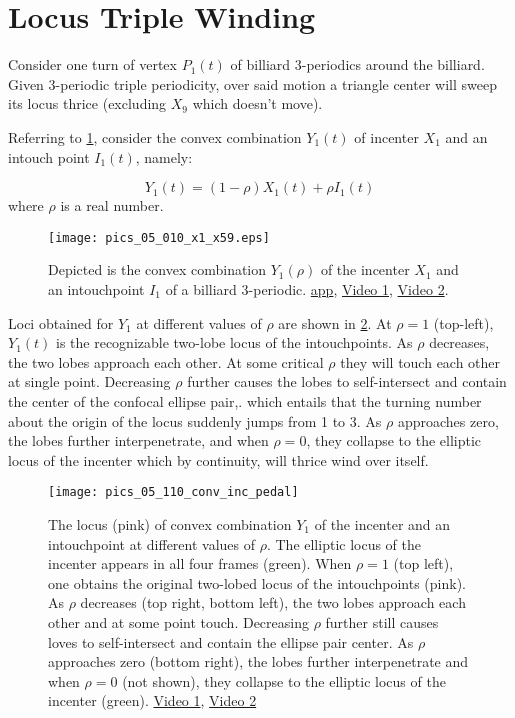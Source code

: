 \section{Locus Triple Winding}
\label{sec:05-triple-winding}

Consider one turn of vertex $P_1(t)$ of billiard 3-periodics around the billiard. Given 3-periodic triple periodicity, over said motion a triangle center will sweep its locus thrice (excluding $X_9$ which doesn't move).

Referring to \cref{fig:05-intouch-rho}, consider the convex combination $Y_1(t)$ of incenter $X_1$ and an intouch point $I_1(t)$, namely:

\[ Y_1(t) = (1-\rho) X_1(t) +  \rho I_1(t)  \]
where $\rho$ is a real number.

\begin{figure}
    \centering
    \texttt{[image: pics\_05\_010\_x1\_x59.eps]}
    \caption{Depicted is the convex combination $Y_1(\rho)$ of the incenter $X_1$ and an intouchpoint $I_1$ of a billiard 3-periodic.  \href{https://bit.ly/3q4b0Nn}{app},  \href{https://youtu.be/BBsyM7RnswA}{Video 1}, \href{https://youtu.be/9xU6T7hQMzs}{Video 2}.}
    \label{fig:05-intouch-rho}
\end{figure}

Loci obtained for $Y_1$ at different values of $\rho$ are shown in \cref{fig:05-inc-wind3}. At $\rho=1$ (top-left), $Y_1(t)$ is the recognizable two-lobe locus of the intouchpoints. As $\rho$ decreases, the two lobes approach each other. At some critical $\rho$ they will touch each other at single point. Decreasing $\rho$ further causes the lobes to self-intersect and contain the center of the confocal ellipse pair,. which entails that the turning number about the origin of the locus suddenly jumps from 1 to 3. As $\rho$ approaches zero, the lobes further interpenetrate, and when $\rho=0$, they collapse to the elliptic locus of the incenter which by continuity, will thrice wind over itself.

\begin{figure}
    \centering
    \texttt{[image: pics\_05\_110\_conv\_inc\_pedal]}
    \caption{The locus (pink) of convex combination $Y_1$ of the incenter and an intouchpoint at different values of $\rho$. The elliptic locus of the incenter appears in all four frames (green). When $\rho=1$ (top left), one obtains the original two-lobed locus of the intouchpoints (pink). As $\rho$ decreases (top right, bottom left), the two lobes approach each other and at some point touch. Decreasing $\rho$ further still causes loves to self-intersect and contain the ellipse pair center. As $\rho$ approaches zero (bottom right), the lobes further interpenetrate and when $\rho=0$ (not shown), they collapse to the elliptic locus of the incenter (green). \href{https://youtu.be/3Gr3Nh5-jHs}{Video 1}, \href{https://youtu.be/HZFjkWD_CnE}{Video 2}}
    \label{fig:05-inc-wind3}
\end{figure}
